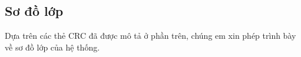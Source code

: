 \subsection{Sơ đồ lớp}
  Dựa trên các thẻ CRC đã được mô tả ở phần trên, chúng em xin phép trình bày về sơ đồ lớp của hệ thống.

